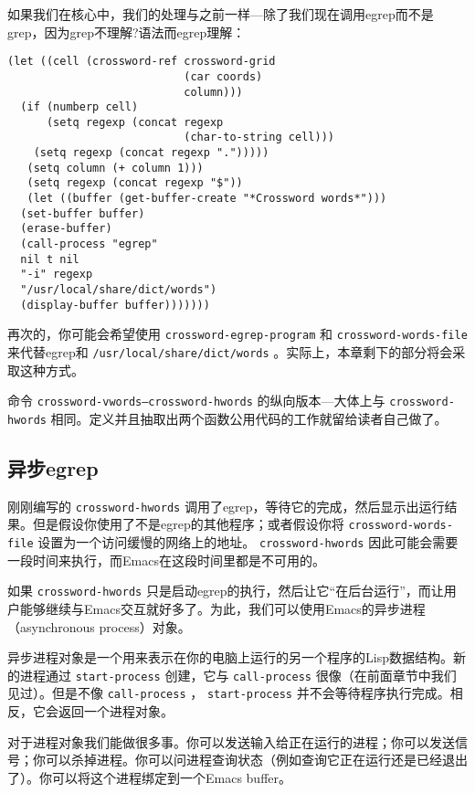 如果我们在核心中，我们的处理与之前一样---除了我们现在调用egrep而不是grep，因为grep不理解?语法而egrep理解：

\begin{verbatim}
(let ((cell (crossword-ref crossword-grid
                           (car coords)
                           column)))
  (if (numberp cell)
      (setq regexp (concat regexp
                           (char-to-string cell)))
    (setq regexp (concat regexp ".")))))
   (setq column (+ column 1)))
   (setq regexp (concat regexp "$"))
   (let ((buffer (get-buffer-create "*Crossword words*")))
  (set-buffer buffer)
  (erase-buffer)
  (call-process "egrep"
  nil t nil
  "-i" regexp
  "/usr/local/share/dict/words")
  (display-buffer buffer)))))))
\end{verbatim}

再次的，你可能会希望使用 \texttt{crossword-egrep-program} 和 \texttt{crossword-words-file} 来代替egrep和 \verb|/usr/local/share/dict/words| 。实际上，本章剩下的部分将会采取这种方式。

命令 \texttt{crossword-vwords--crossword-hwords} 的纵向版本---大体上与 \texttt{crossword-hwords} 相同。定义并且抽取出两个函数公用代码的工作就留给读者自己做了。

\subsection{异步egrep}
\label{section:10-Asynchronous-egrep}

刚刚编写的 \texttt{crossword-hwords} 调用了egrep，等待它的完成，然后显示出运行结果。但是假设你使用了不是egrep的其他程序；或者假设你将 \texttt{crossword-words-file} 设置为一个访问缓慢的网络上的地址。 \texttt{crossword-hwords} 因此可能会需要一段时间来执行，而Emacs在这段时间里都是不可用的。

如果 \texttt{crossword-hwords} 只是启动egrep的执行，然后让它“在后台运行”，而让用户能够继续与Emacs交互就好多了。为此，我们可以使用Emacs的异步进程（asynchronous process）对象。

异步进程对象是一个用来表示在你的电脑上运行的另一个程序的Lisp数据结构。新的进程通过 \texttt{start-process} 创建，它与 \texttt{call-process} 很像（在前面章节中我们见过）。但是不像 \texttt{call-process} ， \texttt{start-process} 并不会等待程序执行完成。相反，它会返回一个进程对象。

对于进程对象我们能做很多事。你可以发送输入给正在运行的进程；你可以发送信号；你可以杀掉进程。你可以问进程查询状态（例如查询它正在运行还是已经退出了）。你可以将这个进程绑定到一个Emacs buffer。

